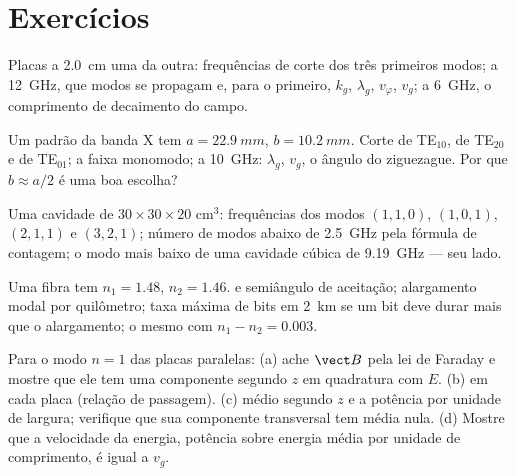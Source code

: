 \section{Exercícios}

\begin{exercise}[$\star$]\label{exo:b2:guided-waves:1}
Placas a \qty{2.0}{cm} uma da outra: frequências de corte dos três primeiros modos;
a \qty{12}{GHz}, que modos se propagam e, para o primeiro, $k_g$,
$\lambda_g$, $v_\varphi$, $v_g$; a \qty{6}{GHz}, o comprimento de decaimento do campo.
\end{exercise}

\begin{exercise}[$\star$]\label{exo:b2:guided-waves:2}
Um  padrão da banda X tem $a = \qty{22.9}{mm}$, $b = \qty{10.2}{mm}$.
Corte de TE$_{10}$, de TE$_{20}$ e de TE$_{01}$; a faixa monomodo; a
\qty{10}{GHz}: $\lambda_g$, $v_g$, o ângulo do ziguezague. Por que $b \approx a/2$
é uma boa escolha?
\end{exercise}

\begin{exercise}[$\star$]\label{exo:b2:guided-waves:3}
Uma cavidade de $30 \times 30 \times 20$ cm$^3$: frequências dos modos $(1,1,0)$,
$(1,0,1)$, $(2,1,1)$ e $(3,2,1)$; número de modos abaixo de \qty{2.5}{GHz} pela
fórmula de contagem; o modo mais baixo de uma cavidade cúbica de \qty{9.19}{GHz}
--- seu lado.
\end{exercise}

\begin{exercise}[$\star$]\label{exo:b2:guided-waves:4}
Uma fibra tem $n_1 = 1.48$, $n_2 = 1.46$.  e semiângulo
de aceitação; alargamento modal por quilômetro; taxa máxima de bits em
\qty{2}{km} se um bit deve durar mais que o alargamento; o mesmo com
$n_1 - n_2 = 0.003$.
\end{exercise}

\begin{exercise}[$\star\star$]\label{exo:b2:guided-waves:5}
Para o modo $n = 1$ das placas paralelas: (a) ache $\vect B$ pela lei de
Faraday e mostre que ele tem uma componente segundo $z$ em quadratura com $E$. (b)  em cada placa (relação de passagem). (c)  médio
segundo $z$ e a potência por unidade de largura; verifique que sua componente
transversal tem média nula. (d) Mostre que a velocidade da energia, potência
sobre energia média por unidade de comprimento, é igual a $v_g$.
\end{exercise}

